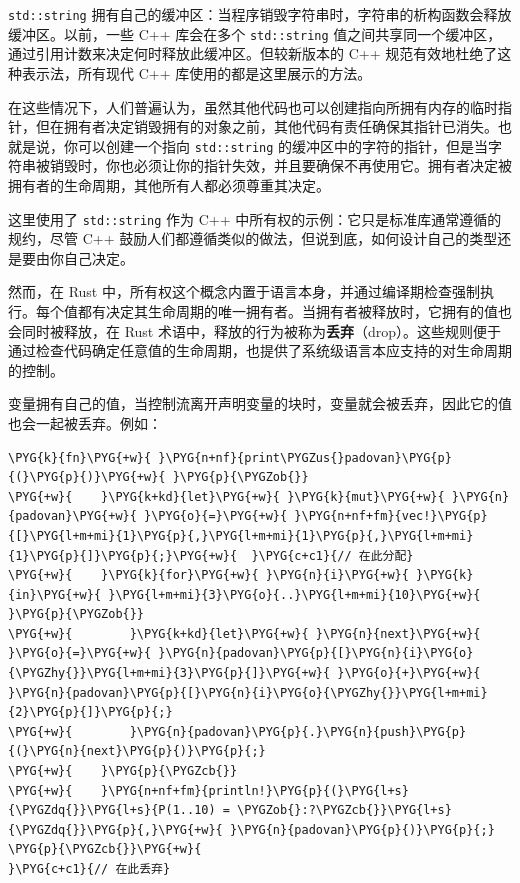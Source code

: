 \texttt{std::string} 拥有自己的缓冲区：当程序销毁字符串时，字符串的析构函数会释放缓冲区。以前，一些 C++ 库会在多个 \texttt{std::string} 值之间共享同一个缓冲区，通过引用计数来决定何时释放此缓冲区。但较新版本的 C++ 规范有效地杜绝了这种表示法，所有现代 C++ 库使用的都是这里展示的方法。

在这些情况下，人们普遍认为，虽然其他代码也可以创建指向所拥有内存的临时指针，但在拥有者决定销毁拥有的对象之前，其他代码有责任确保其指针已消失。也就是说，你可以创建一个指向 \texttt{std::string} 的缓冲区中的字符的指针，但是当字符串被销毁时，你也必须让你的指针失效，并且要确保不再使用它。拥有者决定被拥有者的生命周期，其他所有人都必须尊重其决定。

这里使用了 \texttt{std::string} 作为 C++ 中所有权的示例：它只是标准库通常遵循的规约，尽管 C++ 鼓励人们都遵循类似的做法，但说到底，如何设计自己的类型还是要由你自己决定。

然而，在 Rust 中，所有权这个概念内置于语言本身，并通过编译期检查强制执行。每个值都有决定其生命周期的唯一拥有者。当拥有者被释放时，它拥有的值也会同时被释放，在 Rust 术语中，释放的行为被称为\textbf{丢弃}（drop）。这些规则便于通过检查代码确定任意值的生命周期，也提供了系统级语言本应支持的对生命周期的控制。

变量拥有自己的值，当控制流离开声明变量的块时，变量就会被丢弃，因此它的值也会一起被丢弃。例如：

\begin{Verbatim}[commandchars=\\\{\},breaklines=true,breakanywhere=true,fontsize=\codefont,xleftmargin=17bp]
\PYG{k}{fn}\PYG{+w}{ }\PYG{n+nf}{print\PYGZus{}padovan}\PYG{p}{(}\PYG{p}{)}\PYG{+w}{ }\PYG{p}{\PYGZob{}}
\PYG{+w}{    }\PYG{k+kd}{let}\PYG{+w}{ }\PYG{k}{mut}\PYG{+w}{ }\PYG{n}{padovan}\PYG{+w}{ }\PYG{o}{=}\PYG{+w}{ }\PYG{n+nf+fm}{vec!}\PYG{p}{[}\PYG{l+m+mi}{1}\PYG{p}{,}\PYG{l+m+mi}{1}\PYG{p}{,}\PYG{l+m+mi}{1}\PYG{p}{]}\PYG{p}{;}\PYG{+w}{  }\PYG{c+c1}{// 在此分配}
\PYG{+w}{    }\PYG{k}{for}\PYG{+w}{ }\PYG{n}{i}\PYG{+w}{ }\PYG{k}{in}\PYG{+w}{ }\PYG{l+m+mi}{3}\PYG{o}{..}\PYG{l+m+mi}{10}\PYG{+w}{ }\PYG{p}{\PYGZob{}}
\PYG{+w}{        }\PYG{k+kd}{let}\PYG{+w}{ }\PYG{n}{next}\PYG{+w}{ }\PYG{o}{=}\PYG{+w}{ }\PYG{n}{padovan}\PYG{p}{[}\PYG{n}{i}\PYG{o}{\PYGZhy{}}\PYG{l+m+mi}{3}\PYG{p}{]}\PYG{+w}{ }\PYG{o}{+}\PYG{+w}{ }\PYG{n}{padovan}\PYG{p}{[}\PYG{n}{i}\PYG{o}{\PYGZhy{}}\PYG{l+m+mi}{2}\PYG{p}{]}\PYG{p}{;}
\PYG{+w}{        }\PYG{n}{padovan}\PYG{p}{.}\PYG{n}{push}\PYG{p}{(}\PYG{n}{next}\PYG{p}{)}\PYG{p}{;}
\PYG{+w}{    }\PYG{p}{\PYGZcb{}}
\PYG{+w}{    }\PYG{n+nf+fm}{println!}\PYG{p}{(}\PYG{l+s}{\PYGZdq{}}\PYG{l+s}{P(1..10) = \PYGZob{}:?\PYGZcb{}}\PYG{l+s}{\PYGZdq{}}\PYG{p}{,}\PYG{+w}{ }\PYG{n}{padovan}\PYG{p}{)}\PYG{p}{;}
\PYG{p}{\PYGZcb{}}\PYG{+w}{                                   }\PYG{c+c1}{// 在此丢弃}
\end{Verbatim}

